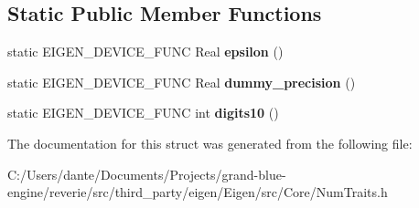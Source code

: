 \subsection*{Static Public Member Functions}
\begin{DoxyCompactItemize}
\item 
\mbox{\label{struct_eigen_1_1_num_traits_3_01std_1_1complex_3_01___real_01_4_01_4_a4fdd6ff81d1edb67db29ef4ef65f77fa}} 
static E\+I\+G\+E\+N\+\_\+\+D\+E\+V\+I\+C\+E\+\_\+\+F\+U\+NC Real {\bfseries epsilon} ()
\item 
\mbox{\label{struct_eigen_1_1_num_traits_3_01std_1_1complex_3_01___real_01_4_01_4_a33b37d5d4526b91d6e925cd4d19c6ca0}} 
static E\+I\+G\+E\+N\+\_\+\+D\+E\+V\+I\+C\+E\+\_\+\+F\+U\+NC Real {\bfseries dummy\+\_\+precision} ()
\item 
\mbox{\label{struct_eigen_1_1_num_traits_3_01std_1_1complex_3_01___real_01_4_01_4_a06b72eb41f48ff3d66d6011c16996167}} 
static E\+I\+G\+E\+N\+\_\+\+D\+E\+V\+I\+C\+E\+\_\+\+F\+U\+NC int {\bfseries digits10} ()
\end{DoxyCompactItemize}


The documentation for this struct was generated from the following file\+:\begin{DoxyCompactItemize}
\item 
C\+:/\+Users/dante/\+Documents/\+Projects/grand-\/blue-\/engine/reverie/src/third\+\_\+party/eigen/\+Eigen/src/\+Core/Num\+Traits.\+h\end{DoxyCompactItemize}
